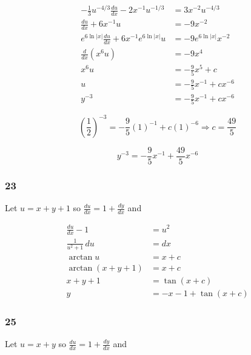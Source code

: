 \documentclass{article}
\begin{document}
\begin{align*}
  -\frac{1}{3} u^{-4 / 3} \frac{du}{dx} - 2 x^{-1} u^{-1 / 3} & = 3 x^{-2} u^{-4 / 3}            \\
  \frac{du}{dx} + 6 x^{-1} u                                  & = -9 x^{-2}                      \\
  e^{6 \ln |x|} \frac{du}{dx} + 6 x^{-1} e^{6 \ln |x|} u      & = -9 e^{6 \ln |x|} x^{-2}        \\
  \frac{d}{dx} (x^6 u)                                        & = -9 x^4                         \\
  x^6 u                                                       & = -\frac{9}{5} x^5 + c           \\
  u                                                           & = -\frac{9}{5} x^{-1} + c x^{-6} \\
  y^{-3}                                                      & = -\frac{9}{5} x^{-1} + c x^{-6}
\end{align*}

\[\left( \frac{1}{2} \right)^{-3} = -\frac{9}{5} (1)^{-1} + c (1)^{-6} \Rightarrow c = \frac{49}{5}\]

\[y^{-3} = -\frac{9}{5} x^{-1} + \frac{49}{5} x^{-6}\]

\subsubsection{23}

Let $u = x + y + 1$ so $\frac{du}{dx} = 1 + \frac{dy}{dx}$ and

\begin{align*}
  \frac{du}{dx} - 1      & = u^2                   \\
  \frac{1}{u^2 + 1} \,du & = dx                    \\
  \arctan u              & = x + c                 \\
  \arctan (x + y + 1)    & = x + c                 \\
  x + y + 1              & = \tan (x + c)          \\
  y                      & = -x - 1 + \tan (x + c)
\end{align*}

\subsubsection{25}

Let $u = x + y$ so $\frac{du}{dx} = 1 + \frac{dy}{dx}$ and
\end{document}
